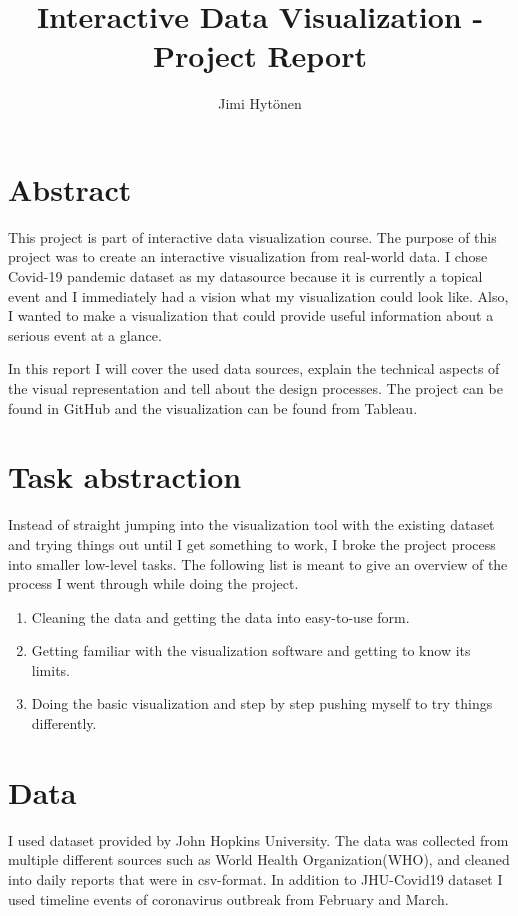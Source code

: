 \documentclass[11pt]{article}
\title{Interactive Data Visualization - Project Report}
\author{
    Jimi Hytönen
}
\begin{document}
\maketitle

\vspace{0.5cm}
\section{Abstract}
This project is part of interactive data visualization course. The purpose of this project was to create an interactive visualization from real-world data. I chose Covid-19 pandemic dataset as my datasource because it is currently a topical event and I immediately had a vision what my visualization could look like. Also, I wanted to make a visualization that could provide useful information about a serious event at a glance.

In this report I will cover the used data sources, explain the technical aspects of the visual representation and tell about the design processes. The project can be found in GitHub\cite{git} and the visualization can be found from Tableau\cite{vis}.

\section{Task abstraction}
Instead of straight jumping into the visualization tool with the existing dataset and trying things out until I get something to work, I broke the project process into smaller low-level tasks. The following list is meant to give an overview of the process I went through while doing the project.
\begin{enumerate}
\item
Cleaning the data and getting the data into easy-to-use form.
\item
Getting familiar with the visualization software and getting to know its limits.
\item
Doing the basic visualization and step by step pushing myself to try things differently.
\end{enumerate}

\newpage
\section{Data}
I used dataset provided by John Hopkins University\cite{jhu}. The data was collected from multiple different sources such as World Health Organization(WHO), and cleaned into daily reports that were in csv-format.
In addition to JHU-Covid19 dataset I used timeline events of coronavirus outbreak from February\cite{feb} and March\cite{mar}.
\end{document}
